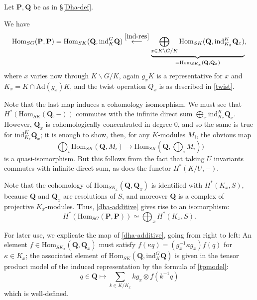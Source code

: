 \documentclass[10pt]{amsart}
\newcommand{\Ad}{\mathrm{Ad}}
\newcommand{\Hom}{\mathrm{Hom}}
\newcommand{\ind}{\mathrm{ind}}
\theoremstyle{remark}
\begin{document}
%
%
%

Let $\mathbf{P}, \mathbf{Q}$ be as in \S \ref{Dha-def}. 

We have \begin{equation} \label{dha-additive} \Hom_{SG}(\mathbf{P},\mathbf{P}) = \Hom_{SK}(   \mathbf{Q}, \ind^G_K  \mathbf{Q}) \stackrel{
\eqref{ind-res}}{
\longleftarrow} \underbrace{ \bigoplus_{x \in K \backslash G/K}   \Hom_{SK}(\mathbf{Q}, \ind_{K_x}^K \mathbf{Q}_x) }_{=
\Hom_{SK_x}(\mathbf{Q}, \mathbf{Q}_{x})},\end{equation} 
where   $x$ varies  now through $K \backslash G/K$, again $g_x K$ is a representative for $x$
and $K_x = K \cap \Ad(g_x) K$, and   the twist operation $Q_x$ is as described in \eqref{twist}. 
 
 Note that the last map induces a cohomology isomorphism.   We must
 see that $H^*(\Hom_{SK}(\mathbf{Q}, -))$  commutes with the infinite direct sum $\bigoplus_x \ind_{K_x}^K \mathbf{Q}_x$. 
 However,  
$\mathbf{Q}_x$ is  cohomologically concentrated in degree $0$, and so the same is true for $\ind_{K_x}^K \mathbf{Q}_x$;
it is enough to show, then, for any $K$-modules $M_i$,  the obvious map
$$ \ \bigoplus_{i} \Hom_{SK}(\mathbf{Q}, M_i) \longrightarrow \Hom_{SK}(\mathbf{Q}, \bigoplus_i M_i))$$
is  a quasi-isomorphism.  But this follows from the fact that  taking $U$ invariants commutes with infinite direct sum,
as does    the functor
 $H^*(K/U, -)$.  
 
 
%
%
Note that the cohomology of 
$ \Hom_{SK_x} (\mathbf{Q}, \mathbf{Q}_x) $  is identified with $H^*(K_x, S)$, because 
$\mathbf{Q}$ and $\mathbf{Q}_x$ are resolutions of $S$, and moreover
$\mathbf{Q}$ is a complex of projective $K_x$-modules. Thus, \eqref{dha-additive}
gives rise to an isomorphism: 
\begin{equation} \label{serre} H^* \left( \Hom_{SG}(\mathbf{P},\mathbf{P})  \right) \simeq \bigoplus_{x} H^*(K_x, S).\end{equation}



    

For later use, we explicate the map of \eqref{dha-additive}, going from right to left: 
An element   $f \in \Hom_{SK_x}(\mathbf{Q}, \mathbf{Q}_{x})$ must satisfy
$f( \kappa q) = (g_x^{-1} \kappa g_x) f(q)$
for $\kappa \in K_x$; the  associated element of $\Hom_{SK}(\mathbf{Q}, \ind^G_K \mathbf{Q})$
is given in the tensor product model  of the induced representation by  the formula of \eqref{tpmodel}: 
$$  q \in  \mathbf{Q} \mapsto \sum_{k \in K/K_x}  k g_x \otimes f(k^{-1} q)$$
which is well-defined.
%
%
%
%
  
\end{document}
